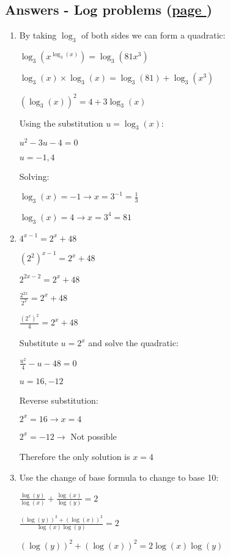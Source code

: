 \documentclass[../main.tex]{subfiles}
\begin{document}
\hypertarget{logproblemsanswers}{\subsection*{Answers - Log problems (\hyperlink{logproblemslink}{page \pageref{Log problems}})}}

\label{Log problems answers}
\begin{enumerate}[itemsep=0.4cm]
    \item     
    By taking $\log_3$ of both sides we can form a quadratic:

    \(\log_3(x^{\log_3(x)})=\log_3(81x^3)\)

    \(\log_3(x)\times \log_3(x)=\log_3(81)+\log_3(x^3)\)

    \((\log_3(x))^2=4+3\log_3(x)\)

    Using the substitution $u=\log_3(x)$:

    \(u^2-3u-4=0\)

    \(u=-1,4\)

    Solving:

    \(\log_3(x)=-1 \rightarrow x=3^{-1} = \frac{1}{3}\)

    \(\log_3(x)=4 \rightarrow x=3^4 = 81\)

    \item 
    \(4^{x-1}=2^x +48\)

    \((2^2)^{x-1}=2^x +48\)

    \(2^{2x-2}=2^x +48\)

    \(\frac{2^{2x}}{2^2}=2^x +48\)

    \(\frac{(2^x)^2}{4}=2^x +48\)

    Substitute $u=2^x$ and solve the quadratic:

    \(\frac{u^2}{4}-u-48=0\)

    \(u=16, -12\)

    Reverse substitution:

    \(2^x=16 \rightarrow x=4\)

    \(2^x = -12 \rightarrow\) Not possible

    Therefore the only solution is $x=4$

    \item Use the change of base formula to change to base 10:

    \(\frac{\log(y)}{\log(x)}+\frac{\log(x)}{\log(y)}=2\)

    \(\frac{(\log(y))^2 + (\log(x))^2}{\log(x)\log(y)}=2\)

    \((\log(y))^2 + (\log(x))^2=2\log(x)\log(y)\)


\end{enumerate}
\end{document}
